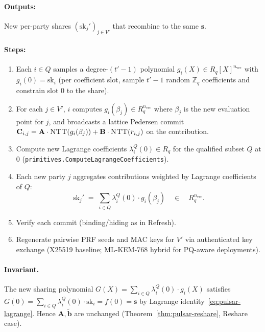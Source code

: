 \paragraph{Outputs:} New per-party shares
$(\mathrm{sk}_j')_{j \in V'}$ that recombine to the same $\mathbf{s}$.

\paragraph{Steps:}
\begin{enumerate}[leftmargin=2em, nosep]
\item Each $i \in Q$ samples a degree-$(t' - 1)$ polynomial
      $g_i(X) \in R_q[X]^{n_{\mathrm{vec}}}$ with $g_i(0) =
      \mathrm{sk}_i$ (per coefficient slot, sample $t' - 1$ random
      $\mathbb{Z}_q$ coefficients and constrain slot 0 to the share).
\item For each $j \in V'$, $i$ computes $g_i(\beta_j) \in
      R_q^{n_{\mathrm{vec}}}$ where $\beta_j$ is the new evaluation
      point for $j$, and broadcasts a lattice Pedersen commit
      $\mathbf{C}_{i,j} = \mathbf{A} \cdot \textsc{NTT}(g_i(\beta_j))
      + \mathbf{B} \cdot \textsc{NTT}(r_{i,j})$ on the contribution.
\item Compute new Lagrange coefficients
      $\lambda^Q_i(0) \in R_q$ for the qualified subset $Q$ at $0$
      (\texttt{primitives.ComputeLagrangeCoefficients}).
\item Each new party $j$ aggregates contributions weighted by
      Lagrange coefficients of $Q$:
      \[
        \mathrm{sk}_j' \;=\; \sum_{i \in Q} \lambda^Q_i(0) \cdot
        g_i(\beta_j) \quad \in \quad R_q^{n_{\mathrm{vec}}}.
      \]
\item Verify each commit (binding/hiding as in Refresh).
\item Regenerate pairwise PRF seeds and MAC keys for $V'$ via
      authenticated key exchange (X25519 baseline; ML-KEM-768 hybrid
      \cite{fips203} for PQ-aware deployments).
\end{enumerate}

\paragraph{Invariant.} The new sharing polynomial
$G(X) = \sum_{i \in Q} \lambda^Q_i(0) \cdot g_i(X)$ satisfies
$G(0) = \sum_{i \in Q} \lambda^Q_i(0) \cdot \mathrm{sk}_i = f(0) =
\mathbf{s}$ by Lagrange identity~\eqref{eq:pulsar-lagrange}. Hence
$\mathbf{A}, \tilde{\mathbf{b}}$ are unchanged
(Theorem~\ref{thm:pulsar-reshare}, Reshare case).

